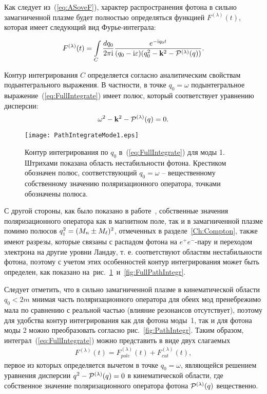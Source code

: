 Как следует из~(\ref{eq:ASoveF}), характер распространения фотона в сильно 
замагниченной плазме будет полностью определяться функцией $F^{(\lambda)} (t)$, 
которая имеет следующий вид Фурье-интеграла:

\begin{equation}\label{eq:FullIntegrate}
	F^{(\lambda)}(t)=\int\limits_{C}\frac{dq_0}{2\pi \ii}\frac{e^{-\ii q_0 
	t}}{(q_0-\ii \varepsilon)(q_0^2-\vec{k}^2-{\cal P}^{(\lambda)}(q))}.
\end{equation}



Контур интегрирования $C$ определяется согласно аналитическим свойствам подынтегрального выражения. В частности, в точке $q_0=\omega$ подынтегральное выражение~(\ref{eq:FullIntegrate}) имеет полюс, который соответствует уравнению дисперсии:
\begin{equation}
	\omega^2 - \vec{k}^2 - {\cal P^{(\lambda)}}(q)=0.
\end{equation}

\begin{center}
	\begin{figure}[t!]\centering
		\texttt{[image: PathIntegrateMode1.eps]}
		\caption{Контур интегрирования по $q_0$ в~(\ref{eq:FullIntegrate}) для 
		моды 1. Штрихами показана область нестабильности фотона. Крестиком 
		обозначен полюс, соответствующий $q_0=\omega$ -- вещественному 
		собственному значению поляризационного оператора, точками обозначены 
		полюса.} \label{fig:FullPathIntegrMode1}
	\end{figure}
\end{center}

С другой стороны, как было показано в работе~\cite{MikhChist:2001}, собственные значения поляризационного оператора как в магнитном поле, так и в замагниченной плазме помимо полюсов $q_{\mprl}^2=(M_n\pm M_\ell)^2$, отмеченных в разделе~\ref{Ch:Compton}, также имеют разрезы, которые связаны с распадом фотона на $e^+e^-$-пару и переходом электрона на другие уровни Ландау, т. е. соответствуют областям нестабильности фотона, поэтому с учетом этих особенностей  контур интегрирования может быть определен, как показано на~рис.~\ref{fig:FullPathIntegrMode1}~и~\ref{fig:FullPathIntegr}.

Следует отметить, что в сильно замагниченной плазме в кинематической области $q_0<2m$ мнимая часть поляризационного оператора для обеих мод пренебрежимо мала по сравнению с реальной частью (влияние резонансов отсутствует), поэтому для удобства контур интегрирования как для фотона моды~1, так и для фотона моды 2 можно преобразовать согласно рис.~\ref{fig:PathIntegr}. Таким образом, интеграл~(\ref{eq:FullIntegrate}) можно представить в виде двух слагаемых
\begin{eqnarray}
F^{(\lambda)}(t) = F^{(\lambda)}_{pole}(t) + F^{(\lambda)}_{cut}(t),
\label{eq:19}
\end{eqnarray}
%
первое из которых определяется вычетом в точке $q_0 = \omega$, являющейся
решением уравнения дисперсии $q^2 - {\cal P}^{(\lambda)}(q) = 0$ в кинематической области, где собственное 
значение поляризационного оператора фотона ${\cal P}^{(\lambda)}(q)$ 
вещественно. 


